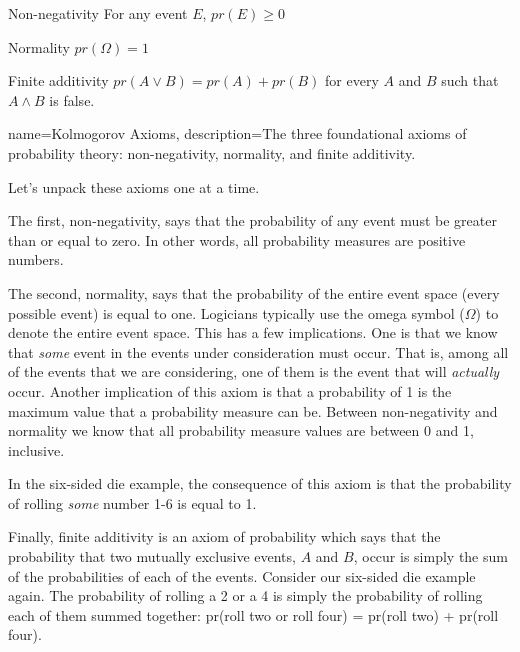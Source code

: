 \begin{description}
\item{Non-negativity} For any event $E$, $pr(E)\ge 0$
\item{Normality} $pr(\Omega) = 1$
\item{Finite additivity} $pr(A \lor B) = pr(A) + pr(B)$ for every $A$ and $B$ such that $A \land B$ is false.
\end{description}

{
name=Kolmogorov Axioms,
description={The three foundational axioms of probability theory: non-negativity, normality, and finite additivity.}
}

Let's unpack these axioms one at a time.

The first, non-negativity, says that the probability of any event must be greater than or equal to zero. In other words, all probability measures are positive numbers.

The second, normality, says that the probability of the entire event space (every possible event) is equal to one. Logicians typically use the omega symbol ($\Omega$) to denote the entire event space. This has a few implications. One is that we know that \emph{some} event in the events under consideration must occur. That is, among all of the events that we are considering, one of them is the event that will \emph{actually} occur. Another implication of this axiom is that a probability of 1 is the maximum value that a probability measure can be. Between non-negativity and normality we know that all probability measure values are between 0 and 1, inclusive.

In the six-sided die example, the consequence of this axiom is that the probability of rolling \emph{some} number 1-6 is equal to 1.

Finally, finite additivity is an axiom of probability which says that the probability that two mutually exclusive events, $A$ and $B$, occur is simply the sum of the probabilities of each of the events. Consider our six-sided die example again. The probability of rolling a 2 or a 4 is simply the probability of rolling each of them summed together: pr(roll two or roll four) = pr(roll two) + pr(roll four).
